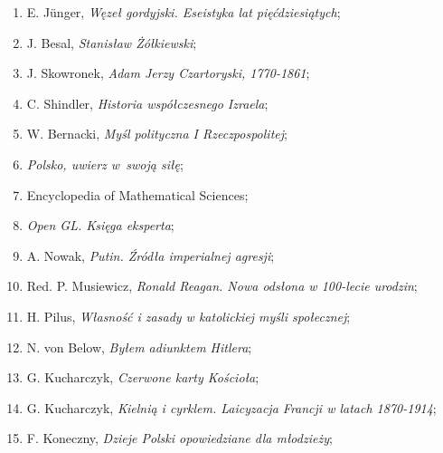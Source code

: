 \documentclass[a4paper,11pt]{article}
\begin{document}
\begin{enumerate}
\item E. J\"{u}nger, \textit{Węzeł gordyjski. Eseistyka lat
    pięćdziesiątych};



\item J. Besal, \textit{Stanisław Żółkiewski};



\item J. Skowronek, \textit{Adam Jerzy Czartoryski, 1770-1861};



\item C. Shindler, \textit{Historia współczesnego Izraela};



\item W. Bernacki, \textit{Myśl polityczna I Rzeczpospolitej};



\item \textit{Polsko, uwierz w~swoją siłę};



\item Encyclopedia of Mathematical Sciences;



\item \textit{Open GL. Księga eksperta};



\item A. Nowak, \textit{Putin. Źródła imperialnej agresji};



\item Red. P. Musiewicz, \textit{Ronald Reagan. Nowa odsłona w 100-lecie
    urodzin};



\item H. Pilus, \textit{Własność i zasady w katolickiej myśli
    społecznej};



\item N. von Below, \textit{Byłem adiunktem Hitlera};



\item G. Kucharczyk, \textit{Czerwone karty Kościoła};



\item G. Kucharczyk, \textit{Kielnią i cyrklem. Laicyzacja Francji w
    latach 1870-1914};



\item F. Koneczny, \textit{Dzieje Polski opowiedziane dla młodzieży};




\end{enumerate}
\end{document}
